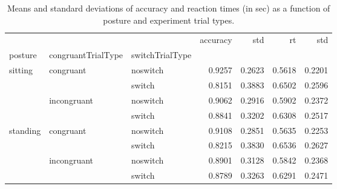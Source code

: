 \begin{table}
\centering
\caption{Means and standard deviations of accuracy and reaction times (in sec) as a function of posture and experiment trial types.}
\label{table-task-switching-replication-reaction-time}
\begin{tabular}{lllrrrr}
\toprule
         &             &        & accuracy &    std &     rt &    std \\
posture & congruantTrialType & switchTrialType &          &        &        &        \\
\midrule
sitting & congruant & noswitch &   0.9257 & 0.2623 & 0.5618 & 0.2201 \\
         &             & switch &   0.8151 & 0.3883 & 0.6502 & 0.2596 \\
         & incongruant & noswitch &   0.9062 & 0.2916 & 0.5902 & 0.2372 \\
         &             & switch &   0.8841 & 0.3202 & 0.6308 & 0.2517 \\
standing & congruant & noswitch &   0.9108 & 0.2851 & 0.5635 & 0.2253 \\
         &             & switch &   0.8215 & 0.3830 & 0.6536 & 0.2627 \\
         & incongruant & noswitch &   0.8901 & 0.3128 & 0.5842 & 0.2368 \\
         &             & switch &   0.8789 & 0.3263 & 0.6291 & 0.2471 \\
\bottomrule
\end{tabular}
\end{table}

